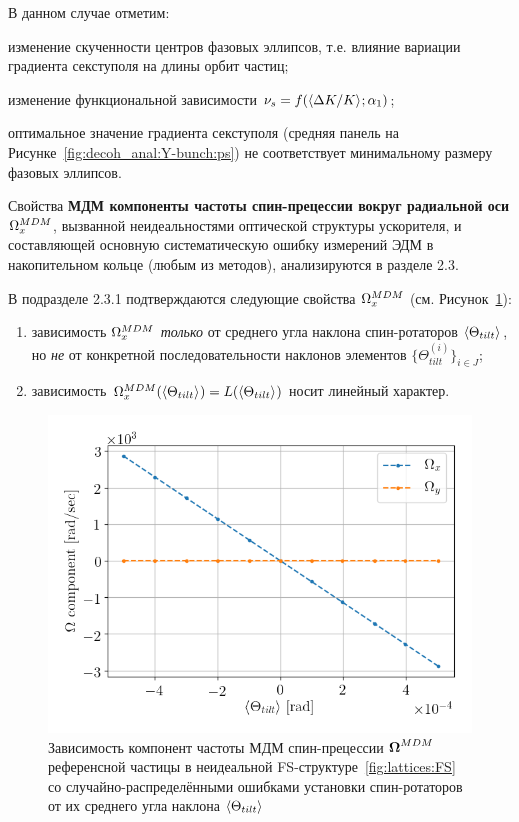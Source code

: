 В данном случае отметим:
\begin{enumerate*}[(1)]
	\item изменение скученности центров фазовых эллипсов, т.е. влияние вариации градиента секступоля 
	на длины орбит частиц;
	\item изменение функциональной зависимости ${\nu_s = f(\avg{\Delta K/K}; \alpha_1)}$;
	\item оптимальное значение градиента секступоля (средняя панель на Рисунке~\ref{fig:decoh_anal:Y-bunch:ps}) 
	не соответствует минимальному размеру фазовых эллипсов.
\end{enumerate*}

Свойства \textbf{МДМ компоненты частоты спин-прецессии вокруг радиальной оси} $\Omega_x^{MDM}$, вызванной 
неидеальностями оптической структуры ускорителя, и составляющей основную 
систематическую ошибку измерений ЭДМ в накопительном кольце (любым из методов), анализируются в разделе 2.3.

В подразделе 2.3.1 подтверждаются следующие свойства $\Omega_x^{MDM}$ (см. Рисунок~\ref{fig:syst:linearity}):
\begin{enumerate}[(1)]
	\item зависимость $\Omega_x^{MDM}$ \emph{только} от среднего угла наклона спин-ротаторов $\avg{\Theta_{tilt}}$, 
	но \emph{не} от конкретной последовательности наклонов элементов $\{\Theta_{tilt}^{(i)}\}_{i\in J}$;
	\item зависимость $\W_x^{MDM}(\avg{\Theta_{tilt}}) = L(\avg{\Theta_{tilt}})$ носит линейный характер.
\end{enumerate}

\begin{figure}[H]\centering
	\includegraphics[height=.35\paperheight]{images/fake_signal_sim/linearity_test_shifting_gauss_freq}
	\caption{Зависимость компонент частоты МДМ спин-прецессии $\boldsymbol{\Omega}^{MDM}$ референсной частицы 
		в неидеальной FS-структуре~\ref{fig:lattices:FS} 
		со случайно-распределёнными ошибками установки спин-ротаторов 
		от их среднего угла наклона $\avg{\Theta_{tilt}}$\label{fig:syst:linearity}}
\end{figure}


